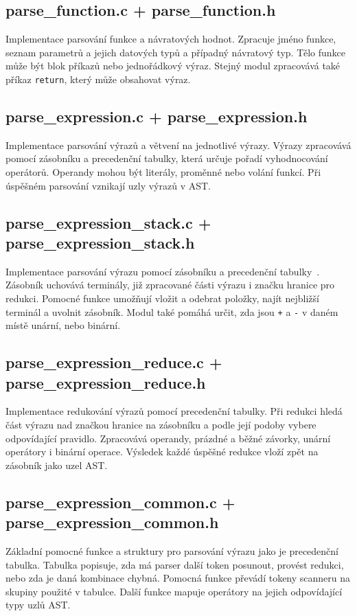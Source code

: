 \subsection*{parse\_function.c + parse\_function.h}
Implementace parsování funkce a návratových hodnot.
Zpracuje jméno funkce, seznam parametrů a jejich datových typů a případný návratový typ. Tělo funkce může být blok příkazů nebo jednořádkový výraz. Stejný modul zpracovává také příkaz \texttt{return}, který může obsahovat výraz.

\subsection*{parse\_expression.c + parse\_expression.h}
Implementace parsování výrazů a větvení na jednotlivé výrazy.
Výrazy zpracovává pomocí zásobníku a precedenční tabulky, která určuje pořadí vyhodnocování operátorů. Operandy mohou být literály, proměnné nebo volání funkcí. Při úspěšném parsování vznikají uzly výrazů v AST.

\subsection*{parse\_expression\_stack.c + parse\_expression\_stack.h}
Implementace parsování výrazu pomocí zásobníku a precedenční tabulky~\cite{ifj_prednasky}.
Zásobník uchovává terminály, již zpracované části výrazu i značku hranice pro redukci. Pomocné funkce umožňují vložit a odebrat položky, najít nejbližší terminál a uvolnit zásobník. Modul také pomáhá určit, zda jsou \texttt{+} a \texttt{-} v daném místě unární, nebo binární.

\subsection*{parse\_expression\_reduce.c + parse\_expression\_reduce.h}
Implementace redukování výrazů pomocí precedenční tabulky.
Při redukci hledá část výrazu nad značkou hranice na zásobníku a podle její podoby vybere odpovídající pravidlo. Zpracovává operandy, prázdné a běžné závorky, unární operátory i binární operace. Výsledek každé úspěšné redukce vloží zpět na zásobník jako uzel AST.

\subsection*{parse\_expression\_common.c + parse\_expression\_common.h}
Základní pomocné funkce a struktury pro parsování výrazu jako je precedenční tabulka.
Tabulka popisuje, zda má parser další token posunout, provést redukci, nebo zda je daná kombinace chybná. Pomocná funkce převádí tokeny scanneru na skupiny použité v tabulce. Další funkce mapuje operátory na jejich odpovídající typy uzlů AST.

